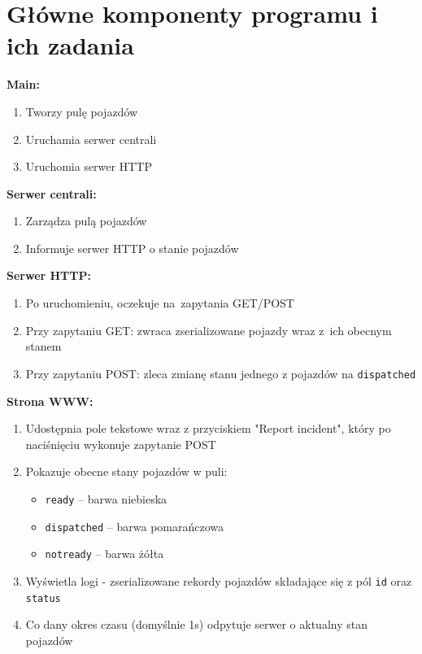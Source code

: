 \documentclass{article}
\begin{document}
\section{Główne komponenty programu i ich zadania}
\textbf{Main:}
\begin{enumerate}
	\item Tworzy pulę pojazdów
	\item Uruchamia serwer centrali
	\item Uruchomia serwer HTTP
\end{enumerate}

\textbf{Serwer centrali:}
\begin{enumerate}
	\item Zarządza pulą pojazdów
	\item Informuje serwer HTTP o stanie pojazdów
\end{enumerate}

\textbf{Serwer HTTP:}
\begin{enumerate}
	\item Po uruchomieniu, oczekuje na~zapytania GET/POST
	\item Przy zapytaniu GET: zwraca zserializowane pojazdy wraz z~ich obecnym stanem
	\item Przy zapytaniu POST: zleca zmianę stanu jednego z pojazdów na \texttt{dispatched}
\end{enumerate}

\textbf{Strona WWW:}
\begin{enumerate}
	\item Udostępnia pole tekstowe wraz z przyciskiem "Report incident", który po naciśnięciu wykonuje zapytanie POST
	\item Pokazuje obecne stany pojazdów w puli:
		\begin{itemize}
			\item \texttt{ready} -- barwa niebieska
			\item \texttt{dispatched} -- barwa pomarańczowa
			\item \texttt{notready} -- barwa żółta
		\end{itemize}
	\item Wyświetla logi - zserializowane rekordy pojazdów składające się z pól \texttt{id} oraz \texttt{status}
	\item Co dany okres czasu (domyślnie 1s) odpytuje serwer o aktualny stan pojazdów
\end{enumerate}
\end{document}

